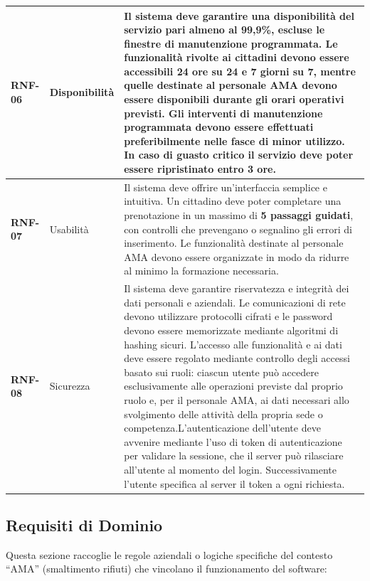 \begin{center}
\begin{longtable}{|p{1.8cm}|p{3.2cm}|p{9.0cm}|}
\textbf{RNF-06} & Disponibilità & Il sistema deve garantire una disponibilità del servizio pari almeno al \textbf{99,9\%}, escluse le finestre di manutenzione programmata. Le funzionalità rivolte ai cittadini devono essere accessibili \textbf{24 ore su 24 e 7 giorni su 7}, mentre quelle destinate al personale AMA devono essere disponibili durante gli orari operativi previsti. Gli interventi di manutenzione programmata devono essere effettuati preferibilmente nelle fasce di minor utilizzo. In caso di guasto critico il servizio deve poter essere ripristinato entro \textbf{3 ore}. \\ \hline

\textbf{RNF-07} & Usabilità & Il sistema deve offrire un'interfaccia semplice e intuitiva. Un cittadino deve poter completare una prenotazione in un massimo di \textbf{5 passaggi guidati}, con controlli che prevengano o segnalino gli errori di inserimento. Le funzionalità destinate al personale AMA devono essere organizzate in modo da ridurre al minimo la formazione necessaria. \\ \hline

\textbf{RNF-08} & Sicurezza & Il sistema deve garantire riservatezza e integrità dei dati personali e aziendali. Le comunicazioni di rete devono utilizzare protocolli cifrati e le password devono essere memorizzate mediante algoritmi di hashing sicuri. L'accesso alle funzionalità e ai dati deve essere regolato mediante controllo degli accessi basato sui ruoli: ciascun utente può accedere esclusivamente alle operazioni previste dal proprio ruolo e, per il personale AMA, ai dati necessari allo svolgimento delle attività della propria sede o competenza.\newline \newline L'autenticazione dell'utente deve avvenire mediante l'uso di token di autenticazione per validare la sessione, che il server può rilasciare all'utente al momento del login. Successivamente l'utente specifica al server il token a ogni richiesta. \\ \hline
\end{longtable}
\end{center}

\subsection{Requisiti di Dominio}
Questa sezione raccoglie le regole aziendali o logiche specifiche del contesto ``AMA'' (smaltimento rifiuti) che vincolano il funzionamento del software:


